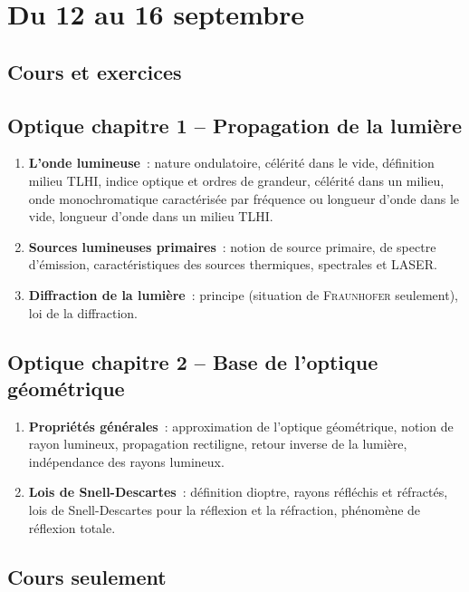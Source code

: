 \documentclass[a4paper, 12pt, final, garamond]{book}
\begin{document}
\setcounter{chapter}{0}

\chapter{Du 12 au 16 septembre}

\section{Cours et exercices}

\section*{Optique chapitre 1 -- Propagation de la lumière}
\begin{enumerate}[label=\Roman*]
    \item \textbf{L'onde lumineuse}~: nature ondulatoire, célérité dans le vide,
        définition milieu TLHI, indice optique et ordres de grandeur, célérité
        dans un milieu, onde monochromatique caractérisée par fréquence ou
        longueur d'onde dans le vide, longueur d'onde dans un milieu TLHI.
    \item \textbf{Sources lumineuses primaires}~: notion de source primaire, de
        spectre d'émission, caractéristiques des sources thermiques, spectrales
        et LASER.
    \item \textbf{Diffraction de la lumière}~: principe (situation de
        \textsc{Fraunhofer} seulement), loi de la diffraction.
\end{enumerate}

\section*{Optique chapitre 2 -- Base de l'optique géométrique}
\begin{enumerate}[label=\Roman*]
    \item \textbf{Propriétés générales}~: approximation de l'optique
        géométrique, notion de rayon lumineux, propagation rectiligne, retour
        inverse de la lumière, indépendance des rayons lumineux.
    \item \textbf{Lois de Snell-Descartes}~: définition dioptre, rayons
        réfléchis et réfractés, lois de Snell-Descartes pour la réflexion et la
        réfraction, phénomène de réflexion totale.
\end{enumerate}

\section{Cours seulement}
\end{document}
